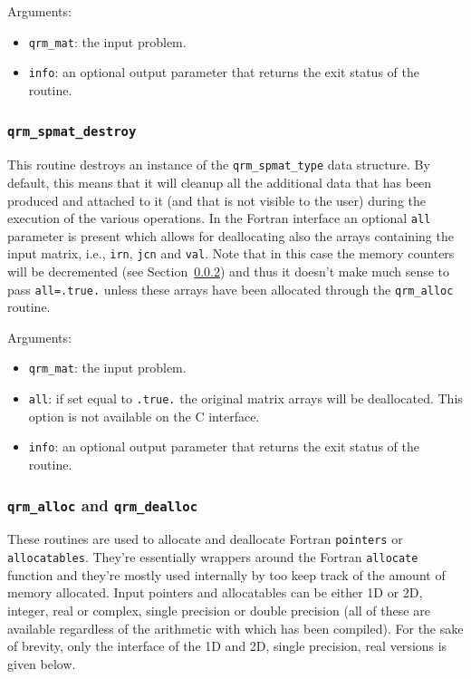 \documentclass[11pt]{article}
\begin{document}
\noindent Arguments:
\begin{itemize}
\item \texttt{qrm\_mat}: the input problem.
\item \texttt{info}: an optional output parameter that returns the
  exit status of the routine.
\end{itemize}

\subsubsection{\texttt{qrm\_spmat\_destroy}}
This routine destroys an instance of the \texttt{qrm\_spmat\_type} data
structure. By default, this means that it will cleanup all the
additional data that has been produced and attached to it (and that is
not visible to the user) during the execution of the various \qrm
operations. In the Fortran interface an optional \texttt{all}
parameter is present which allows for deallocating also the arrays
containing the input matrix, i.e., \texttt{irn}, \texttt{jcn} and
\texttt{val}. Note that in this case the memory counters will be
decremented (see Section~\ref{sec:alloc}) and thus it doesn't make much
sense to pass \texttt{all=.true.} unless these arrays have been
allocated through the \texttt{qrm\_alloc} routine.



\noindent Arguments:
\begin{itemize}
\item \texttt{qrm\_mat}: the input problem.
\item \texttt{all}: if set equal to \texttt{.true.} the original
  matrix arrays will be deallocated. This option is not available on
  the C interface.
\item \texttt{info}: an optional output parameter that returns the
  exit status of the routine.
\end{itemize}

\subsubsection{\texttt{qrm\_alloc} and \texttt{qrm\_dealloc}}
\label{sec:alloc}

These routines are used to allocate and deallocate Fortran
\texttt{pointers} or \texttt{allocatables}. They're essentially
wrappers around the Fortran \texttt{allocate} function and they're
mostly used internally by \qrm too keep track of the amount of memory
allocated. Input pointers and allocatables can be either 1D or 2D,
integer, real or complex, single precision or double precision (all of
these are available regardless of the arithmetic with which \qrm has
been compiled).  For the sake of brevity, only the interface of the 1D
and 2D, single precision, real versions is given
below. 
\end{document}
